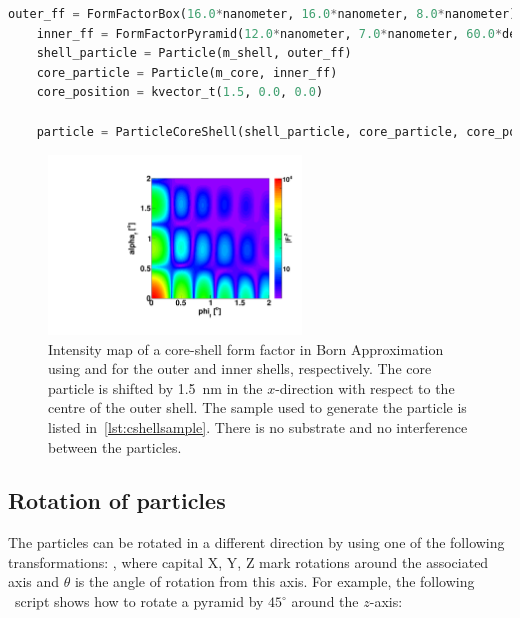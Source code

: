 \newpage


\begin{lstlisting}[language=python,
  style=eclipseboxed,numbers=none,nolol,caption={\Code{Python} script
    to create a core-shell particle made of a box with a pyramidal shifted inset.},label={lst:cshellsample}]
    outer_ff = FormFactorBox(16.0*nanometer, 16.0*nanometer, 8.0*nanometer) 
    inner_ff = FormFactorPyramid(12.0*nanometer, 7.0*nanometer, 60.0*degree)
    shell_particle = Particle(m_shell, outer_ff)
    core_particle = Particle(m_core, inner_ff)
    core_position = kvector_t(1.5, 0.0, 0.0)

    particle = ParticleCoreShell(shell_particle, core_particle, core_position)
\end{lstlisting}

\begin{figure}[ht]
\begin{center}
\includegraphics[angle=-90,width=0.6\textwidth]{Figures/gisasmap/CoreShellParallPyr.pdf}
\end{center}
\caption{Intensity map of a core-shell form factor in Born Approximation using   and  for the outer and inner shells, respectively. The core particle is shifted by 1.5~nm in the $x$-direction with respect to the centre of the outer shell. The sample used to generate the particle is listed in~\ref{lst:cshellsample}.  There is no substrate and no interference between the particles.}
\label{fig:FFCoreShellBA}
\end{figure}

\subsection{Rotation of particles}

The particles can be rotated in a different direction by using one of
the following transformations: , where capital X, Y, Z mark rotations
around the associated axis and $\theta$ is the
angle of rotation from this axis. For example, the following \ script shows how to rotate a pyramid by $45^{\circ}$ around
the $z$-axis:\\

